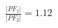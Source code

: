\documentclass[preview]{standalone}
\begin{document}
\begin{align*}
\frac{|PF_1|}{|PF_2|} = 1.12
\end{align*}
\end{document}
